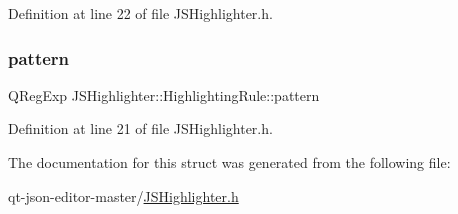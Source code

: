 Definition at line 22 of file J\+S\+Highlighter.\+h.

\mbox{\label{struct_j_s_highlighter_1_1_highlighting_rule_a21244028be3616d0a10cbed6f4bf192c}} 
\subsubsection{\texorpdfstring{pattern}{pattern}}
{\footnotesize\ttfamily Q\+Reg\+Exp J\+S\+Highlighter\+::\+Highlighting\+Rule\+::pattern}



Definition at line 21 of file J\+S\+Highlighter.\+h.



The documentation for this struct was generated from the following file\+:\begin{DoxyCompactItemize}
\item 
qt-\/json-\/editor-\/master/\hyperlink{_j_s_highlighter_8h}{J\+S\+Highlighter.\+h}\end{DoxyCompactItemize}
